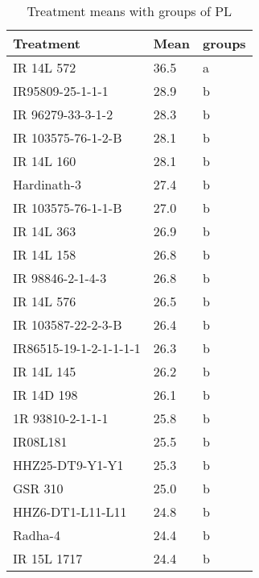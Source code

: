 \documentclass[]{article}
\begin{document}
\begin{longtable}{lll}
\caption{\label{tab:two-fac-groups-tab2}Treatment means with groups of PL}\\
\toprule
Treatment & Mean & groups\\
\midrule
\rowcolor{gray!6}  IR 14L 572 & 36.5 & a\\
IR95809-25-1-1-1 & 28.9 & b\\
\rowcolor{gray!6}  IR 96279-33-3-1-2 & 28.3 & b\\
IR 103575-76-1-2-B & 28.1 & b\\
\rowcolor{gray!6}  IR 14L 160 & 28.1 & b\\
\addlinespace
Hardinath-3 & 27.4 & b\\
\rowcolor{gray!6}  IR 103575-76-1-1-B & 27.0 & b\\
IR 14L 363 & 26.9 & b\\
\rowcolor{gray!6}  IR 14L 158 & 26.8 & b\\
IR 98846-2-1-4-3 & 26.8 & b\\
\addlinespace
\rowcolor{gray!6}  IR 14L 576 & 26.5 & b\\
IR 103587-22-2-3-B & 26.4 & b\\
\rowcolor{gray!6}  IR86515-19-1-2-1-1-1-1 & 26.3 & b\\
IR 14L 145 & 26.2 & b\\
\rowcolor{gray!6}  IR 14D 198 & 26.1 & b\\
\addlinespace
1R 93810-2-1-1-1 & 25.8 & b\\
\rowcolor{gray!6}  IR08L181 & 25.5 & b\\
HHZ25-DT9-Y1-Y1 & 25.3 & b\\
\rowcolor{gray!6}  GSR 310 & 25.0 & b\\
HHZ6-DT1-L11-L11 & 24.8 & b\\
\addlinespace
\rowcolor{gray!6}  Radha-4 & 24.4 & b\\
IR 15L 1717 & 24.4 & b\\
\bottomrule
\end{longtable}
\endgroup{}
\begingroup\fontsize{12}{14}\selectfont
\end{document}
